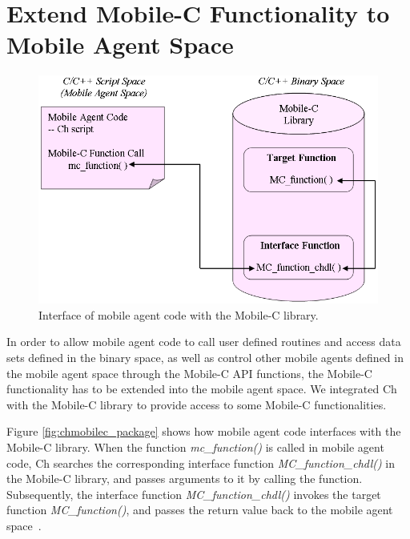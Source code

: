 \documentclass[11pt]{report}
\begin{document}
\chapter{Extend Mobile-C Functionality to Mobile Agent Space}
\begin{figure}[b]
\begin{center}
   \includegraphics[scale=0.5]{figure/chmobilec_package}
   \caption{Interface of mobile agent code with the Mobile-C library.}
   \label{fig:chmobilec_package}
\end{center}
\end{figure}
In order to allow mobile agent code to call user defined routines and 
access data sets defined in the binary space, as well as control 
other mobile agents defined in the mobile agent space through the 
Mobile-C API functions, the Mobile-C functionality has to be extended into 
the mobile agent space.
We integrated Ch with the Mobile-C library to provide access to some 
Mobile-C functionalities. 

Figure \vref{fig:chmobilec_package} shows how mobile agent code interfaces 
with the Mobile-C library.
When the function \textit{mc\_function()} is called in mobile agent code,
Ch searches the corresponding interface function \textit{MC\_function\_chdl()} 
in the Mobile-C library, and passes arguments to it by calling the function.
Subsequently, the interface function \textit{MC\_function\_chdl()} invokes the 
target function \textit{MC\_function()}, and passes the return value back to 
the mobile agent space~\cite{EmbeddedCh}.
\end{document}
